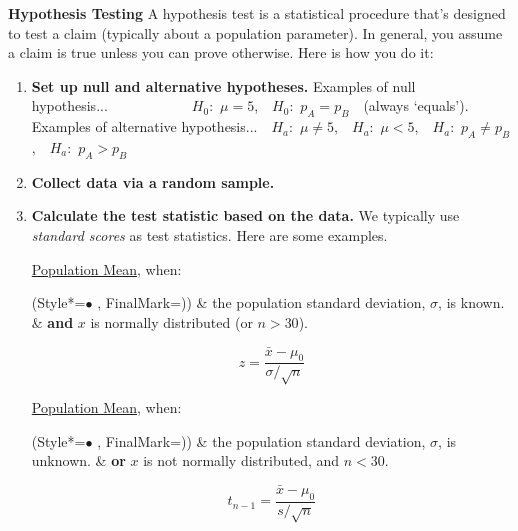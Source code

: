 \vspace{+3.5mm}
\textbf{Hypothesis Testing}
\newline
A hypothesis test is a statistical procedure that's designed to test a claim (typically about a population parameter).
In general, you assume a claim is true unless you can prove otherwise.
Here is how you do it:
\vspace{-3.5mm}
\begin{enumerate}
\item
\textbf{Set up null and alternative hypotheses.}
\newline
Examples of null hypothesis...~~~~~~~~~~~~$H_0$:~$\mu = 5$,~~$H_0$:~$p_A = p_B$~~(always `equals').
\newline
Examples of alternative hypothesis...~~$H_a$:~$\mu \neq 5$,~~$H_a$:~$\mu < 5$,~~$H_a$:~$p_A \neq p_B$,~~$H_a$:~$p_A > p_B$
\item
\textbf{Collect data via a random sample.}
\item
\textbf{Calculate the test statistic based on the data.}
\newline
We typically use \textit{standard scores} as test statistics.
Here are some examples.

\underline{Population Mean}, when:
\begin{easylist}[itemize]
\ListProperties(Style*=$\bullet$ , FinalMark={)})
\vspace{-2.0mm}
& the population standard deviation, $\sigma$, is known.
\vspace{-3.5mm}
& \textbf{and} $x$ is normally distributed (or $n>30$).
\end{easylist}
% 
\vspace{-5.0mm}
\begin{equation}
z = \frac{\bar{x} - \mu_0}{\sigma / \sqrt{n}}
\end{equation}

\underline{Population Mean}, when:
\begin{easylist}[itemize]
\ListProperties(Style*=$\bullet$ , FinalMark={)})
\vspace{-2.0mm}
& the population standard deviation, $\sigma$, is unknown.
\vspace{-3.5mm}
& \textbf{or} $x$ is not normally distributed, and $n < 30$.
\end{easylist}
% 
\vspace{-5.0mm}
\begin{equation}
t_{n-1} = \frac{\bar{x} - \mu_0}{s / \sqrt{n}}
\end{equation}


\end{enumerate}
